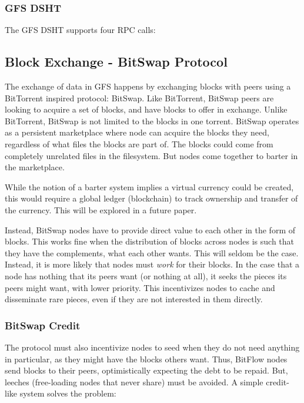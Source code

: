 \documentclass{sig-alternate}
\begin{document}
\subsubsection{GFS DSHT}

The GFS DSHT supports four RPC calls:



\subsection{Block Exchange - BitSwap Protocol}

The exchange of data in GFS happens by exchanging blocks with peers using a
BitTorrent inspired protocol: BitSwap. Like BitTorrent, BitSwap peers are
looking to acquire a set of blocks, and have blocks to offer in exchange.
Unlike BitTorrent, BitSwap is not limited to the blocks in one torrent.
BitSwap operates as a persistent marketplace where node can acquire the
blocks they need, regardless of what files the blocks are part of. The
blocks could come from completely unrelated files in the filesystem.
But nodes come together to barter in the marketplace.

While the notion of a barter system implies a virtual currency could be
created, this would require a global ledger (blockchain) to track ownership
and transfer of the currency. This will be explored in a future paper.

Instead, BitSwap nodes have to provide direct value to each other
in the form of blocks. This works fine when the distribution of blocks across
nodes is such that they have the complements, what each other wants. This will
seldom be the case. Instead, it is more likely that nodes must \textit{work}
for their blocks. In the case that a node has nothing that its peers want (or
nothing at all), it seeks the pieces its peers might want, with lower
priority. This incentivizes nodes to cache and disseminate rare pieces, even
if they are not interested in them directly.

\subsubsection{BitSwap Credit}

The protocol must also incentivize nodes to seed when they do not need
anything in particular, as they might have the blocks others want. Thus,
BitFlow nodes send blocks to their peers, optimistically expecting the debt to
be repaid. But, leeches (free-loading nodes that never share) must be avoided. A simple credit-like system solves the problem:
\end{document}
